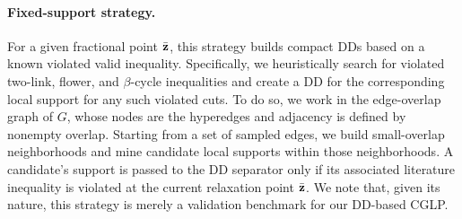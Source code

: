 \paragraph{Fixed-support strategy.} For a given fractional point $\bar {\mathbf{z}}$, this strategy builds compact DDs based on a known violated valid inequality. Specifically, we heuristically search for violated two-link, flower, and $\beta$-cycle inequalities and create a DD for the corresponding local support for any such violated cuts. To do so, we work in the edge-overlap graph of $G$, whose nodes are the hyperedges and adjacency is defined by nonempty overlap. Starting from a set of sampled edges, we build small-overlap neighborhoods and mine candidate local supports within those neighborhoods. A candidate's support is passed to the DD separator only if its associated literature inequality is violated at the current relaxation point $\bar {\mathbf{z}}$. We note that, given its nature, this strategy is merely a validation benchmark for our DD-based CGLP.




